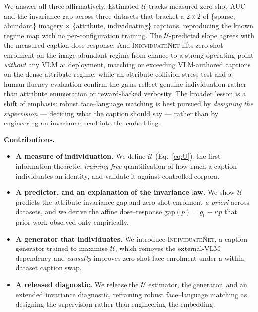 \documentclass[10pt,twocolumn,letterpaper]{article}
\newcommand{\U}{\mathcal{U}}
\newcommand{\method}{\textsc{IndividuateNet}}
\begin{document}
We answer all three affirmatively. Estimated $\U$ tracks measured zero-shot AUC and the
invariance gap across three datasets that bracket a $2\times2$ of \{sparse, abundant\} imagery
$\times$ \{attribute, individuating\} captions, reproducing the known regime map with no
per-configuration training. The $\U$-predicted slope agrees with the measured caption-dose
response. And \method{} lifts zero-shot enrolment on the image-abundant regime from chance to a
strong operating point \emph{without} any VLM at deployment, matching or exceeding VLM-authored
captions on the dense-attribute regime, while an attribute-collision stress test and a human
fluency evaluation confirm the gains reflect genuine individuation rather than attribute
enumeration or reward-hacked verbosity. The broader lesson is a shift of emphasis: robust
face--language matching is best pursued by \emph{designing the supervision} --- deciding what the
caption should say --- rather than by engineering an invariance head into the embedding.

\vspace{2pt}
\noindent\textbf{Contributions.}
\begin{itemize}\itemsep2pt
  \item \textbf{A measure of individuation.} We define $\U$
        (Eq.~\ref{eq:U}), the first information-theoretic, \emph{training-free} quantification of
        how much a caption individuates an identity, and validate it against controlled corpora.
  \item \textbf{A predictor, and an explanation of the invariance law.} We show $\U$ predicts the
        attribute-invariance gap and zero-shot enrolment \emph{a priori} across datasets, and we
        derive the affine dose--response $\mathrm{gap}(p)=g_0-\kappa p$ that prior work observed
        only empirically.
  \item \textbf{A generator that individuates.} We introduce \method, a caption generator trained
        to maximise $\U$, which removes the external-VLM dependency and \emph{causally} improves
        zero-shot face enrolment under a within-dataset caption swap.
  \item \textbf{A released diagnostic.} We release the $\U$ estimator, the generator, and an
        extended invariance diagnostic, reframing robust face--language matching as designing the
        supervision rather than engineering the embedding.
\end{itemize}

\end{document}
